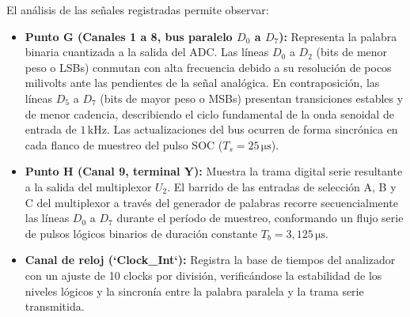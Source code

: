 El análisis de las señales registradas permite observar:
\begin{itemize}
    \item \textbf{Punto G (Canales 1 a 8, bus paralelo $D_0$ a $D_7$):} Representa la palabra binaria cuantizada a la
          salida del ADC. Las líneas $D_0$ a $D_2$ (bits de menor peso o LSBs) conmutan con alta frecuencia debido a su
          resolución de pocos milivolts ante las pendientes de la señal analógica. En contraposición, las líneas $D_5$ a
          $D_7$ (bits de mayor peso o MSBs) presentan transiciones estables y de menor cadencia, describiendo el ciclo
          fundamental de la onda senoidal de entrada de $1\,\unit{\kilo\hertz}$. Las actualizaciones del bus ocurren de
          forma sincrónica en cada flanco de muestreo del pulso SOC ($T_s = 25\,\unit{\micro\second}$).
    \item \textbf{Punto H (Canal 9, terminal Y):} Muestra la trama digital serie resultante a la salida del multiplexor
          $U_2$. El barrido de las entradas de selección A, B y C del multiplexor a través del generador de palabras
          recorre secuencialmente las líneas $D_0$ a $D_7$ durante el período de muestreo, conformando un flujo serie de
          pulsos lógicos binarios de duración constante $T_b = 3{,}125\,\unit{\micro\second}$.
    \item \textbf{Canal de reloj (`Clock\_Int`):} Registra la base de tiempos del analizador con un ajuste de 10 clocks
          por división, verificándose la estabilidad de los niveles lógicos y la sincronía entre la palabra paralela y
          la trama serie transmitida.
\end{itemize}
